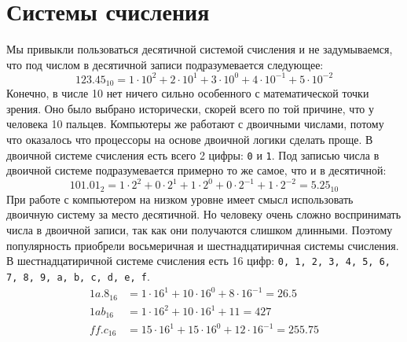 \documentclass{article}
\begin{document}
\section*{Системы счисления}
Мы привыкли пользоваться десятичной системой счисления и не задумываемся, что под числом в десятичной записи подразумевается следующее:
$$
123.45_{10} = 1 \cdot 10^2 + 2 \cdot 10^1 + 3 \cdot 10^0 + 4 \cdot 10^{-1} + 5 \cdot 10^{-2}
$$
Конечно, в числе 10 нет ничего сильно особенного с математической точки зрения. Оно было выбрано исторически, скорей всего по той причине, что у человека 10 пальцев. Компьютеры же работают с двоичными числами, потому что оказалось что процессоры на основе двоичной логики сделать проще. В двоичной системе счисления есть всего 2 цифры: \texttt{0} и \texttt{1}. Под записью числа в двоичной системе подразумевается примерно то же самое, что и в десятичной:
$$
101.01_2 = 1 \cdot 2^2 + 0 \cdot 2^1 + 1 \cdot 2^0 + 0 \cdot 2^{-1} + 1 \cdot 2^{-2} = 5.25_{10}
$$
При работе с компьютером на низком уровне имеет смысл использовать двоичную систему за место десятичной.  Но человеку очень сложно воспринимать числа в двоичной записи, так как они получаются слишком длинными. Поэтому популярность приобрели восьмеричная и шестнадцатиричная системы счисления. В шестнадцатиричной системе счисления есть 16 цифр: \texttt{0, 1, 2, 3, 4, 5, 6, 7, 8, 9, a, b, c, d, e, f}.
\begin{align*}
1a.8_{16} &= 1 \cdot 16^1 + 10 \cdot 16^0 + 8 \cdot 16^{-1} = 26.5\\
1ab_{16}  &= 1 \cdot 16^2 + 10 \cdot 16^1 + 11 = 427\\
ff.c_{16} &= 15 \cdot 16^ 1 + 15 \cdot 16^0 + 12 \cdot 16^{-1} = 255.75
\end{align*}
\end{document}
